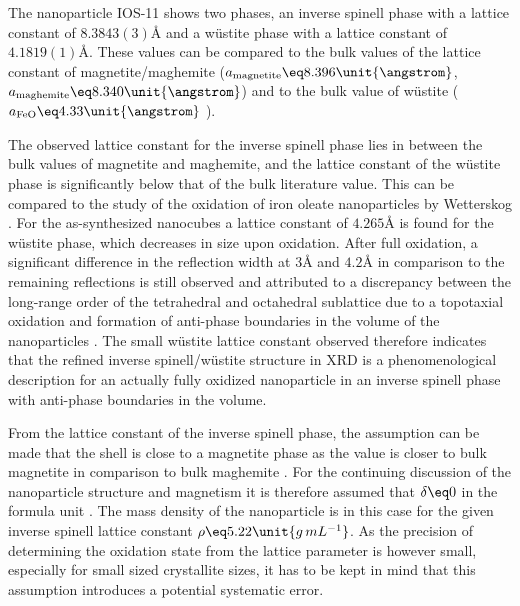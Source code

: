 \documentclass[\main/dresen_thesis.tex]{subfiles}
\begin{document}
    The nanoparticle IOS-11 shows two phases, an inverse spinell phase with a lattice constant of $8.3843(3) \unit{\angstrom}$ and a w\"ustite phase with a lattice constant of $4.1819(1) \unit{\angstrom}$.
    These values can be compared to the bulk values of the lattice constant of magnetite/maghemite ($a_\mathrm{magnetite} \eq 8.396 \unit{\angstrom}$, $a_\mathrm{maghemite} \eq 8.340 \unit{\angstrom}$) \cite{Cornell_2003_Their} and to the bulk value of w\"ustite ($a_\mathrm{FeO} \eq 4.33 \unit{\angstrom}$ \cite{Hentschel_1970_Stoich}).

    The observed lattice constant for the inverse spinell phase lies in between the bulk values of magnetite and maghemite, and the lattice constant of the w\"ustite phase is significantly below that of the bulk literature value.
    This can be compared to the study of the oxidation of iron oleate nanoparticles by Wetterskog \etal \cite{Wetterskog_2013_Anoma}.
    For the as-synthesized nanocubes a lattice constant of $4.265 \unit{\angstrom}$ is found for the w\"ustite phase, which decreases in size upon oxidation.
    After full oxidation, a significant difference in the reflection width at $3 \unit{\angstrom}$ and $4.2 \unit{\angstrom}$ in comparison to the remaining reflections is still observed and attributed to a discrepancy between the long-range order of the tetrahedral and octahedral sublattice due to a topotaxial oxidation and formation of anti-phase boundaries in the volume of the nanoparticles \cite{Wetterskog_2013_Anoma}.
    The small w\"ustite lattice constant observed therefore indicates that the refined inverse spinell/w\"ustite structure in XRD is a phenomenological description for an actually fully oxidized nanoparticle in an inverse spinell phase with anti-phase boundaries in the volume.

    From the lattice constant of the inverse spinell phase, the assumption can be made that the shell is close to a magnetite phase as the value is closer to bulk magnetite in comparison to bulk maghemite \cite{Cervellino_2014_Latti}.
    For the continuing discussion of the nanoparticle structure and magnetism it is therefore assumed that $\delta \eq 0$ in the formula unit  .
    The mass density of the nanoparticle is in this case for the given inverse spinell lattice constant $\rho \eq 5.22 \unit{g\, mL^{-1}}$.
    As the precision of determining the oxidation state from the lattice parameter is however small, especially for small sized crystallite sizes, it has to be kept in mind that this assumption introduces a potential systematic error.
    \\
\end{document}

